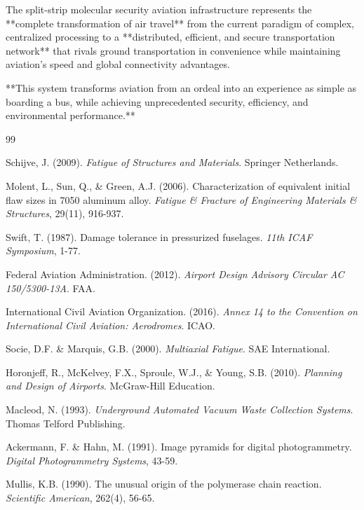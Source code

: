 \documentclass[12pt,a4paper]{article}
\begin{document}
The split-strip molecular security aviation infrastructure represents the **complete transformation of air travel** from the current paradigm of complex, centralized processing to a **distributed, efficient, and secure transportation network** that rivals ground transportation in convenience while maintaining aviation's speed and global connectivity advantages.

**This system transforms aviation from an ordeal into an experience as simple as boarding a bus, while achieving unprecedented security, efficiency, and environmental performance.**

\begin{thebibliography}{99}

Schijve, J. (2009). \textit{Fatigue of Structures and Materials}. Springer Netherlands.

Molent, L., Sun, Q., \& Green, A.J. (2006). Characterization of equivalent initial flaw sizes in 7050 aluminum alloy. \textit{Fatigue \& Fracture of Engineering Materials \& Structures}, 29(11), 916-937.

Swift, T. (1987). Damage tolerance in pressurized fuselages. \textit{11th ICAF Symposium}, 1-77.

Federal Aviation Administration. (2012). \textit{Airport Design Advisory Circular AC 150/5300-13A}. FAA.

International Civil Aviation Organization. (2016). \textit{Annex 14 to the Convention on International Civil Aviation: Aerodromes}. ICAO.

Socie, D.F. \& Marquis, G.B. (2000). \textit{Multiaxial Fatigue}. SAE International.

Horonjeff, R., McKelvey, F.X., Sproule, W.J., \& Young, S.B. (2010). \textit{Planning and Design of Airports}. McGraw-Hill Education.

Macleod, N. (1993). \textit{Underground Automated Vacuum Waste Collection Systems}. Thomas Telford Publishing.

Ackermann, F. \& Hahn, M. (1991). Image pyramids for digital photogrammetry. \textit{Digital Photogrammetry Systems}, 43-59.

Mullis, K.B. (1990). The unusual origin of the polymerase chain reaction. \textit{Scientific American}, 262(4), 56-65.


\end{thebibliography}
\end{document}

